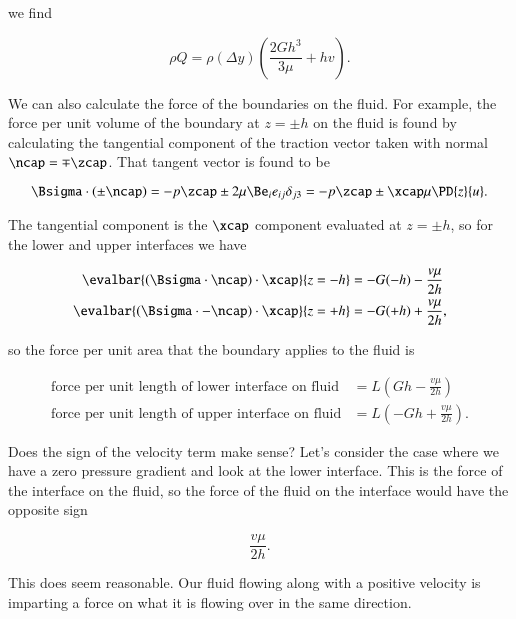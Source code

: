 \begin{Answer}[ref={problem:fluids:review:q1}]
we find 

\begin{equation}\label{eqn:continuumFluidsReview:1370}
\rho Q =
\rho (\Delta y) \left( 
\frac{2 G h^3}{3 \mu} + h v
\right).
\end{equation}

We can also calculate the force of the boundaries on the fluid.  For example, the force per unit volume of the boundary at $z = \pm h$ on the fluid is found by calculating the tangential component of the traction vector taken with normal $\ncap = \mp \zcap$.  That tangent vector is found to be

\begin{equation}\label{eqn:continuumFluidsReview:1390}
\Bsigma \cdot (\pm \ncap) = -p \zcap \pm 2 \mu \Be_i e_{ij} \delta_{j 3} = - p \zcap \pm \xcap \mu \PD{z}{u}.
\end{equation}

The tangential component is the $\xcap$ component evaluated at $z = \pm h$, so for the lower and upper interfaces we have

\begin{align}\label{eqn:continuumFluidsReview:1410}
\evalbar{(\Bsigma \cdot \ncap) \cdot \xcap}{z = -h} &= -G (-h) - \frac{v \mu}{2 h} \\
\evalbar{(\Bsigma \cdot -\ncap) \cdot \xcap}{z = +h} &= -G (+h) + \frac{v \mu}{2 h},
\end{align}

so the force per unit area that the boundary applies to the fluid is

\begin{align}\label{eqn:continuumFluidsReview:1430}
\text{force per unit length of lower interface on fluid} &= L \left( G h - \frac{v \mu}{2 h} \right) \\
\text{force per unit length of upper interface on fluid} 
&= L \left( -G h + \frac{v \mu}{2 h} \right).
\end{align}

Does the sign of the velocity term make sense?  Let's consider the case where we have a zero pressure gradient and look at the lower interface.  This is the force of the interface on the fluid, so the force of the fluid on the interface would have the opposite sign

\begin{equation}\label{eqn:continuumFluidsReview:1470}
\frac{v \mu}{2 h}.
\end{equation}

This does seem reasonable.  Our fluid flowing along with a positive velocity is imparting a force on what it is flowing over in the same direction.
\end{Answer}

